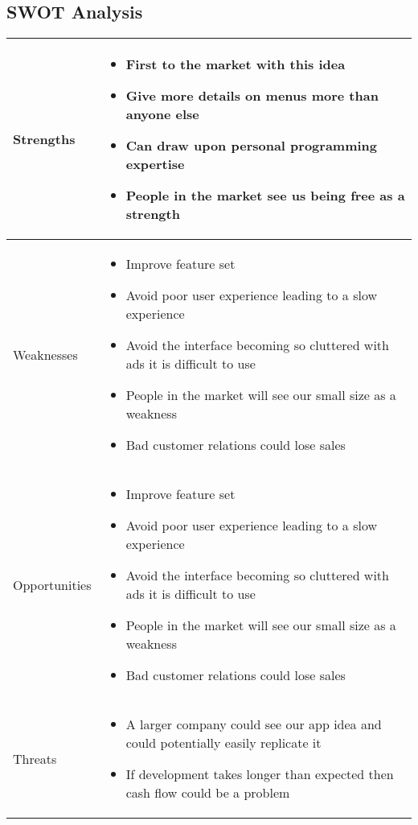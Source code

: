 \documentclass{article}[18pt]
\begin{document}
\begin{appendices}
\subsection{SWOT Analysis}
\label{appendix:SWOT}
\begin{center}
{\renewcommand{\arraystretch}{2}
\begin{tabular}{| m{0.2\linewidth} |m{0.8\linewidth}|}
\hline
Strengths&
\begin{itemize}
	\item First to the market with this idea
	\item Give more details on menus more than anyone else
	\item Can draw upon personal programming expertise
	\item People in the market see us being free as a strength
\end{itemize}\\
\hline
Weaknesses&
\begin{itemize}
	\item Improve feature set
	\item Avoid poor user experience leading to a slow experience
	\item Avoid the interface becoming so cluttered with ads it is difficult to use
	\item People in the market will see our small size as a weakness
	\item Bad customer relations could lose sales
\end{itemize}\\
\hline
Opportunities&
\begin{itemize}
	\item Improve feature set
	\item Avoid poor user experience leading to a slow experience
	\item Avoid the interface becoming so cluttered with ads it is difficult to use
	\item People in the market will see our small size as a weakness
	\item Bad customer relations could lose sales
\end{itemize}\\
\hline
Threats&
\begin{itemize}
	\item A larger company could see our app idea and could potentially easily replicate it
	\item If development takes longer than expected then cash flow could be a problem
\end{itemize}\\
\hline			
\end{tabular}}
\end{center}
\newpage

\end{appendices}
\end{document}

